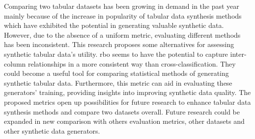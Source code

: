 
Comparing two tabular datasets has been growing in demand in the past year mainly because of the increase in popularity of tabular data synthesis methods which have exhibited the potential in generating valuable synthetic data. However, due to the absence of a uniform metric, evaluating different methods has been inconsistent. This research proposes some alternatives for assessing synthetic tabular data's utility. \ac{rbo} seems to have the potential to capture inter-column relationships in a more consistent way than cross-classification. They could become a useful tool for comparing statistical methods of generating synthetic tabular data. Furthermore, this metric can aid in evaluating these generators' training, providing insights into improving synthetic data quality. The proposed metrics open up possibilities for future research to enhance tabular data synthesis methods and compare two datasets overall. Future research could be expanded in new comparison with others evaluation metrics, other datasets and other synthetic data generators.